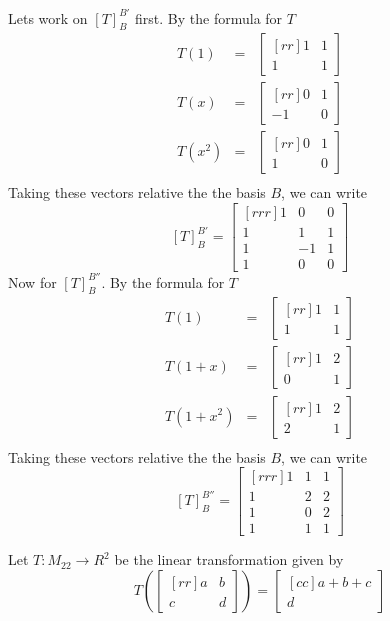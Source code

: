 \begin{solution}
\noindent Lets work on $[T]_{B}^{B'}$ first. By the formula for $T$
\begin{eqnarray*}
T(1) &=&
\begin{bmatrix}[rr]
1&1\\
1&1
\end{bmatrix}\\
T(x) &=&
\begin{bmatrix}[rr]
0&1\\
-1&0
\end{bmatrix}\\
T(x^2) &=&
\begin{bmatrix}[rr]
0&1\\
1&0
\end{bmatrix}\\
\end{eqnarray*}
Taking these vectors relative the the basis $B$, we can write
$$
[T]_{B}^{B'} =
\begin{bmatrix}[rrr]
1&0&0\\
1&1&1\\
1&-1&1\\
1&0&0
\end{bmatrix}
$$
Now for $[T]_{B}^{B''}$. By the formula for $T$
\begin{eqnarray*}
T(1) &=&
\begin{bmatrix}[rr]
1&1\\
1&1
\end{bmatrix}\\
T(1+x) &=&
\begin{bmatrix}[rr]
1&2\\
0&1
\end{bmatrix}\\
T(1+x^2) &=&
\begin{bmatrix}[rr]
1&2\\
2&1
\end{bmatrix}\\
\end{eqnarray*}
Taking these vectors relative the the basis $B$, we can write
$$
[T]_{B}^{B''} =
\begin{bmatrix}[rrr]
1&1&1\\
1&2&2\\
1&0&2\\
1&1&1
\end{bmatrix}
$$
\end{solution}
\ii Let $T:M_{22} \rightarrow R^2$ be the linear transformation given by
$$
T\left(
\begin{bmatrix}[rr]
a&b\\
c&d
\end{bmatrix}
\right)
= 
\begin{bmatrix}[cc]
a+b+c\\
d
\end{bmatrix}
$$
